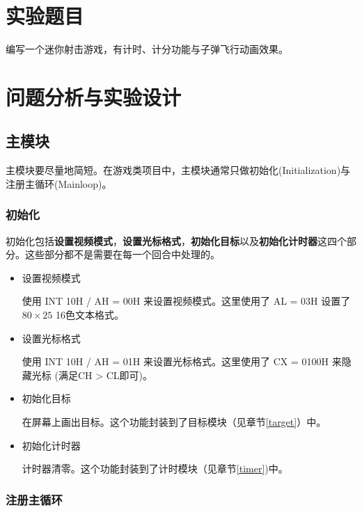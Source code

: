 \section{实验题目}
编写一个迷你射击游戏，有计时、计分功能与子弹飞行动画效果。

\section{问题分析与实验设计}

\subsection{主模块}

主模块要尽量地简短。在游戏类项目中，主模块通常只做初始化(Initialization)与注册主循环(Mainloop)。

\subsubsection{初始化}

初始化包括\textbf{设置视频模式}，\textbf{设置光标格式}，\textbf{初始化目标}以及\textbf{初始化计时器}这四个部分。这些部分都不是需要在每一个回合中处理的。

\begin{itemize}
    \item 设置视频模式
    
    使用 INT 10H / AH = 00H 来设置视频模式。这里使用了 AL = 03H 设置了 $80 \times 25$ 16色文本格式。
    
    \item 设置光标格式
    
    使用 INT 10H / AH = 01H 来设置光标格式。这里使用了 CX = 0100H 来隐藏光标 (满足CH > CL即可)。
    
    \item 初始化目标
    
    在屏幕上画出目标。这个功能封装到了目标模块（见章节\ref{target}）中。
    
    \item 初始化计时器
    
    计时器清零。这个功能封装到了计时模块（见章节\ref{timer})中。
    
\end{itemize}

\subsubsection{注册主循环}

